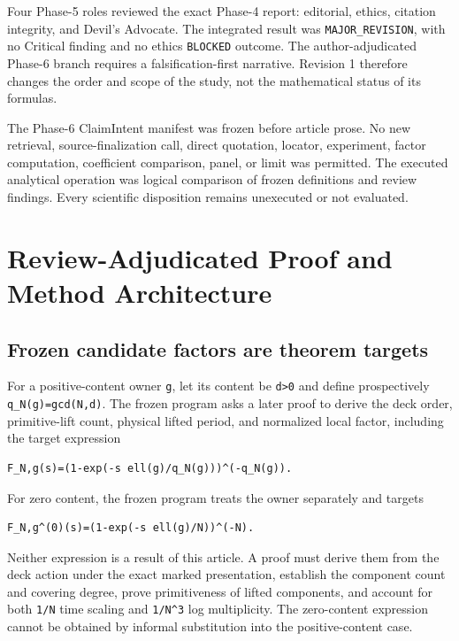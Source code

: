 \documentclass[11pt]{article}
\begin{document}
Four Phase-5 roles reviewed the exact Phase-4 report: editorial, ethics,
citation integrity, and Devil's Advocate. The integrated result was
\texttt{MAJOR\_REVISION}, with no Critical finding and no ethics
\texttt{BLOCKED} outcome. The author-adjudicated Phase-6 branch requires
a falsification-first narrative. Revision 1 therefore changes the order
and scope of the study, not the mathematical status of its formulas.

The Phase-6 ClaimIntent manifest was frozen before article prose. No new
retrieval, source-finalization call, direct quotation, locator,
experiment, factor computation, coefficient comparison, panel, or limit
was permitted. The executed analytical operation was logical comparison
of frozen definitions and review findings. Every scientific disposition
remains unexecuted or not evaluated.

\hypertarget{4-review-adjudicated-proof-and-method-architecture}{%
\section{Review-Adjudicated Proof and Method
Architecture}\label{4-review-adjudicated-proof-and-method-architecture}}

\hypertarget{41-frozen-candidate-factors-are-theorem-targets}{%
\subsection{Frozen candidate factors are theorem
targets}\label{41-frozen-candidate-factors-are-theorem-targets}}

For a positive-content owner \texttt{g}, let its content be
\texttt{d\textgreater{}0} and define prospectively
\texttt{q\_N(g)=gcd(N,d)}. The frozen program asks a later proof to
derive the deck order, primitive-lift count, physical lifted period, and
normalized local factor, including the target expression

\begin{verbatim}
F_N,g(s)=(1-exp(-s ell(g)/q_N(g)))^(-q_N(g)).
\end{verbatim}

For zero content, the frozen program treats the owner separately and
targets

\begin{verbatim}
F_N,g^(0)(s)=(1-exp(-s ell(g)/N))^(-N).
\end{verbatim}

Neither expression is a result of this article. A proof must derive them from
the deck action under the exact marked presentation, establish the
component count and covering degree, prove primitiveness of lifted
components, and account for both \texttt{1/N} time scaling and
\texttt{1/N\^{}3} log multiplicity. The zero-content expression cannot
be obtained by informal substitution into the positive-content case.
\end{document}
